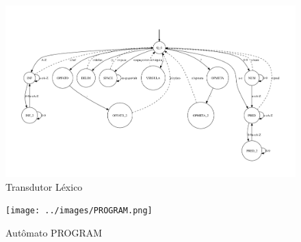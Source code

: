 \documentclass[12pt]{article}
\begin{document}




\begin{figure}[H]
\includegraphics[width=1.3\textwidth,angle=90]{./transdutor.pdf}  
\caption{Transdutor Léxico}
\end{figure}


\begin{figure}[H]
\centering 
\texttt{[image: ../images/PROGRAM.png]}  
\caption{Autômato PROGRAM}
\end{figure}
\end{document}
